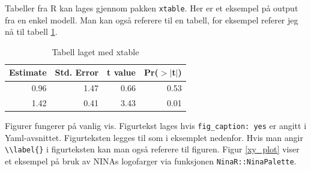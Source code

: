 \documentclass[11pt, a4paper]{article}
\newenvironment{Shaded}{\begin{snugshade}}{\end{snugshade}}
\newcommand{\AttributeTok}[1]{\textcolor[rgb]{0.13,0.29,0.53}{#1}}
\newcommand{\DecValTok}[1]{\textcolor[rgb]{0.00,0.00,0.81}{#1}}
\newcommand{\FunctionTok}[1]{\textcolor[rgb]{0.13,0.29,0.53}{\textbf{#1}}}
\newcommand{\NormalTok}[1]{#1}
\newcommand{\OtherTok}[1]{\textcolor[rgb]{0.56,0.35,0.01}{#1}}
\newcommand{\SpecialCharTok}[1]{\textcolor[rgb]{0.81,0.36,0.00}{\textbf{#1}}}
\newcommand{\StringTok}[1]{\textcolor[rgb]{0.31,0.60,0.02}{#1}}
\begin{document}
Tabeller fra R kan lages gjennom pakken \texttt{xtable}. Her er et
eksempel på output fra en enkel modell. Man kan også referere til en
tabell, for eksempel referer jeg nå til tabell \ref{tab1}.

\begin{Shaded}
\end{Shaded}

\begin{table}[ht]
\centering
\begin{tabular}{rrrr}
  \hline
Estimate & Std. Error & t value & Pr($>$$|$t$|$) \\ 
  \hline
0.96 & 1.47 & 0.66 & 0.53 \\ 
  1.42 & 0.41 & 3.43 & 0.01 \\ 
   \hline
\end{tabular}
\caption{Tabell laget med xtable \label{tab1}} 
\end{table}

Figurer fungerer på vanlig vis. Figurtekst lages hvis
\texttt{fig\_caption:\ yes} er angitt i Yaml-avsnittet. Figurteksten
legges til som i eksemplet nedenfor. Hvis man angir
\texttt{\textbackslash{}\textbackslash{}label\{\}} i figurteksten kan
man også referere til figuren. Figur \ref{xy_plot} viser et eksempel på
bruk av NINAs logofarger via funksjonen \texttt{NinaR::NinaPalette}.
\end{document}
